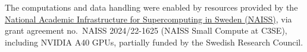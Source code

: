 The computations and data handling were enabled by resources provided by the
\href{https://naiss.se}{National Academic Infrastructure for Supercomputing in Sweden (NAISS)},
via grant agreement no.\ NAISS 2024/22-1625 (NAISS Small Compute at C3SE), including NVIDIA A40 GPUs, partially funded by the Swedish Research Council.
